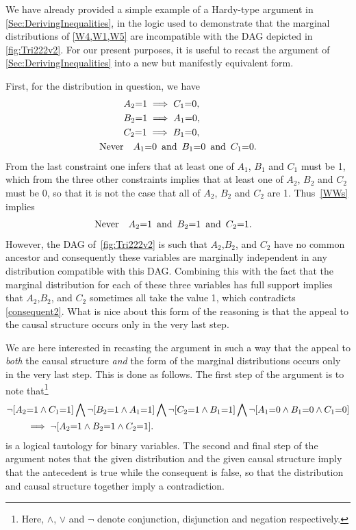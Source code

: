 {We have already provided a simple example of a Hardy-type argument in \cref{Sec:DerivingInequalities}, in the logic used to demonstrate that the marginal distributions of \cref{W4,W1,W5} are incompatible with the DAG depicted in \cref{fig:Tri222v2}.   For our present purposes, it is useful to recast the argument of \cref{Sec:DerivingInequalities} into a new but manifestly equivalent form.    

First, for the distribution in question, we have
\begin{align} 
\begin{split}\label{WWs}
&A_2 \mathord{=} 1 \implies C_1\mathord{=} 0,\\
&B_2\mathord{=} 1 \implies A_1\mathord{=} 0,\\
&C_2 \mathord{=} 1 \implies B_1 \mathord{=} 0,\\
\text{Never}  &\quad A_1 \mathord{=} 0\,\text{ and }\, B_1 \mathord{=} 0\,\text{ and }\, C_1 \mathord{=} 0.
\end{split}
\end{align}
From the last constraint one infers that at least one of $A_1$, $B_1$ and $C_1$ must be 1, which from the three other constraints implies that at least one of $A_2$, $B_2$ and $C_2$ must be 0, so that it is not the case that all of $A_2$, $B_2$ and $C_2$ are 1.  Thus~\cref{WWs} implies
\begin{align} \label{consequent2}
\text{Never}  \quad &A_2 \mathord{=} 1\,\text{ and }\, B_2 \mathord{=} 1\,\text{ and }\, C_2 \mathord{=} 1.
\end{align}
However, the DAG of~\cref{fig:Tri222v2} is such that $A_2$,$B_2$, and $C_2$ have no common ancestor and consequently these variables are marginally independent in any distribution compatible with this DAG.  Combining this with the fact that the marginal distribution for each of these three variables has full support implies that $A_2$,$B_2$, and $C_2$ sometimes all take the value 1, which contradicts \cref{consequent2}.  What is nice about this form of the reasoning is that the appeal to the causal structure occurs only in the very last step.  

We are here interested in recasting the argument in such a way that the appeal to {\em both} the causal structure {\em and} the form of the marginal distributions occurs only in the very last step.  This is done as follows.  The first step of the argument is to note that\footnote{Here, $\land$, $\lor$ and $\lnot$ denote conjunction, disjunction and negation respectively.}
\begin{align}\begin{split}\label{tautology1}
&\lnot [A_2 \mathord{=} 1 \land C_1 \mathord{=} 1] \bigwedge \lnot [B_2 \mathord{=} 1 \land A_1 \mathord{=} 1] \bigwedge \lnot [C_2 \mathord{=} 1 \land B_1 \mathord{=} 1] \bigwedge \lnot [A_1 \mathord{=} 0 \land B_1 \mathord{=} 0 \land C_1 \mathord{=} 0]\\
 &\qquad\implies
\lnot [A_2 \mathord{=} 1 \land B_2 \mathord{=} 1 \land C_2 \mathord{=} 1].
\end{split}\end{align}
is a logical tautology for binary variables. The second and final step of the argument notes that the given distribution and the given causal structure imply that the antecedent is true while the consequent is false, so that the distribution and causal structure together imply a contradiction.

}

